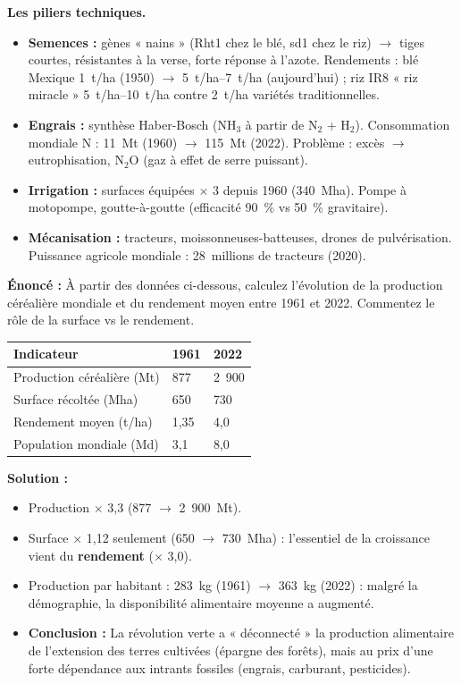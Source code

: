 \documentclass[11pt]{article}
\begin{document}
\textbf{Les piliers techniques.}\par
\begin{itemize}
    \item \textbf{Semences :} gènes « nains » (Rht1 chez le blé, sd1 chez le riz) $\to$ tiges courtes, résistantes à la verse, forte réponse à l'azote. Rendements : blé Mexique \SI{1}{t/ha} (1950) $\to$ \SIrange{5}{7}{t/ha} (aujourd'hui) ; riz IR8 « riz miracle » \SIrange{5}{10}{t/ha} contre \SI{2}{t/ha} variétés traditionnelles.
    \item \textbf{Engrais :} synthèse Haber-Bosch (NH$_3$ à partir de N$_2$ + H$_2$). Consommation mondiale N : \SI{11}{Mt} (1960) $\to$ \SI{115}{Mt} (2022). Problème : excès $\to$ eutrophisation, N$_2$O (gaz à effet de serre puissant).
    \item \textbf{Irrigation :} surfaces équipées $\times$ 3 depuis 1960 (\SI{340}{Mha}). Pompe à motopompe, goutte-à-goutte (efficacité 90~\% vs 50~\% gravitaire).
    \item \textbf{Mécanisation :} tracteurs, moissonneuses-batteuses, drones de pulvérisation. Puissance agricole mondiale : 28~millions de tracteurs (2020).
\end{itemize}

\begin{exoresolu}
\textbf{Énoncé :} À partir des données ci-dessous, calculez l'évolution de la production céréalière mondiale et du rendement moyen entre 1961 et 2022. Commentez le rôle de la surface vs le rendement.

\begin{center}
\begin{tabularx}{\linewidth}{|l|X|X|}\hline
Indicateur & 1961 & 2022 \\ \hline
Production céréalière (Mt) & 877 & 2~900 \\ \hline
Surface récoltée (Mha) & 650 & 730 \\ \hline
Rendement moyen (t/ha) & 1,35 & 4,0 \\ \hline
Population mondiale (Md) & 3,1 & 8,0 \\ \hline
\end{tabularx}
\end{center}

\tcblower
\textbf{Solution :}
\begin{itemize}
    \item Production $\times$ 3,3 (877 $\to$ 2~900~Mt).
    \item Surface $\times$ 1,12 seulement (650 $\to$ 730~Mha) : l'essentiel de la croissance vient du \textbf{rendement} ($\times$ 3,0).
    \item Production par habitant : \SI{283}{kg} (1961) $\to$ \SI{363}{kg} (2022) : malgré la démographie, la disponibilité alimentaire moyenne a augmenté.
    \item \textbf{Conclusion :} La révolution verte a « déconnecté » la production alimentaire de l'extension des terres cultivées (épargne des forêts), mais au prix d'une forte dépendance aux intrants fossiles (engrais, carburant, pesticides).
\end{itemize}
\end{exoresolu}
\end{document}

